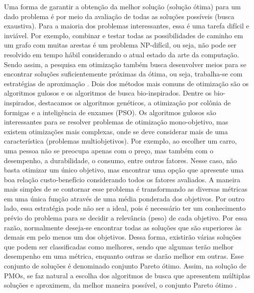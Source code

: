 Uma forma de garantir a obtenção da melhor solução (solução ótima) para um dado problema é por meio da avaliação de todas as soluções possíveis (busca exaustiva). Para a maioria dos problemas interessantes, essa é uma tarefa difícil e inviável. Por exemplo, combinar e testar todas as possibilidades de caminho em um grafo com muitas arestas é um problema NP-difícil, ou seja, não pode ser resolvido em tempo hábil considerando o atual estado da arte da computação. Sendo assim, a pesquisa em otimização também busca desenvolver meios para se encontrar soluções suficientemente próximas da ótima, ou seja, trabalha-se com estratégias de aproximação \cite{GreedyAlgorithms}. Dois dos métodos mais comuns de otimização são os algoritmos gulosos e os algoritmos de busca bio-inspirados. Dentre os bio-inspirados, destacamos os algoritmos genéticos, a otimização por colônia de formigas e a inteligência de enxames (PSO). Os algoritmos gulosos são interessantes para se resolver problemas de otimização mono-objetivo, mas existem otimizações mais complexas, onde se deve considerar mais de uma característica (problemas multiobjetivos). Por exemplo, ao escolher um carro, uma pessoa não se preocupa apenas com o preço, mas também com o desempenho, a durabilidade, o consumo, entre outros fatores. Nesse caso, não basta otimizar um único objetivo, mas encontrar uma opção que apresente uma boa relação custo-benefício considerando todos os fatores avaliados. A maneira mais simples de se contornar esse problema é transformando as diversas métricas em uma única função através de uma média ponderada dos objetivos. Por outro lado, essa estratégia pode não ser a ideal, pois é necessário ter um conhecimento prévio do problema para se decidir a relevância (peso) de cada objetivo. Por essa razão, normalmente deseja-se encontrar todas as soluções que são superiores às demais em pelo menos um dos objetivos. Dessa forma, existirão várias soluções que podem ser classificadas como
melhores, sendo que algumas terão melhor desempenho em uma métrica, enquanto outras se darão melhor em outras.  Esse conjunto de soluções é denominado conjunto Pareto ótimo. Assim, na solução de \acp{PMO}, se faz natural a escolha dos algoritmos de busca que apresentem múltiplas soluções e aproximem, da melhor maneira possível, o conjunto Pareto ótimo \cite{Srinivas1994}.

